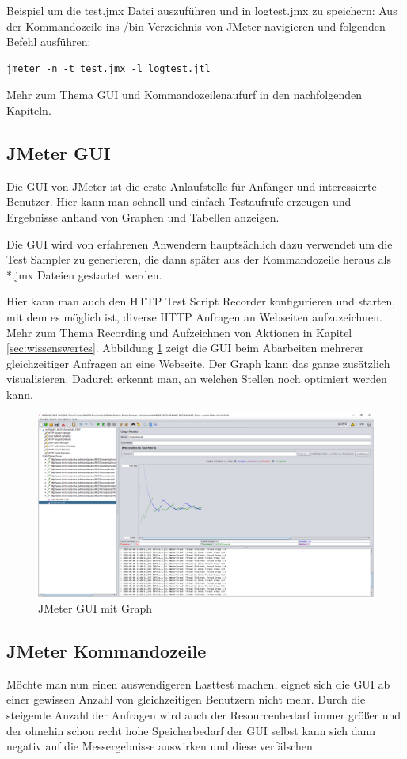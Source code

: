 \documentclass[a4paper,12pt]{article}
\begin{document}
Beispiel um die test.jmx Datei auszuführen und in logtest.jmx zu speichern: Aus der Kommandozeile ins /bin Verzeichnis von JMeter navigieren und folgenden Befehl ausführen: \
\begin{lstlisting}
jmeter -n -t test.jmx -l logtest.jtl
\end{lstlisting}
Mehr zum Thema GUI und Kommandozeilenaufurf in den nachfolgenden Kapiteln.

\subsection{JMeter GUI}
Die GUI von JMeter ist die erste Anlaufstelle für Anfänger und interessierte Benutzer. Hier kann man schnell und einfach Testaufrufe erzeugen und Ergebnisse anhand von Graphen und Tabellen anzeigen. 

Die GUI wird von erfahrenen Anwendern hauptsächlich dazu verwendet um die Test Sampler zu generieren, die dann später aus der Kommandozeile heraus als *.jmx Dateien gestartet werden.

Hier kann man auch den HTTP Test Script Recorder konfigurieren und starten, mit dem es möglich ist, diverse HTTP Anfragen an Webseiten aufzuzeichnen. Mehr zum Thema Recording und Aufzeichnen von Aktionen in Kapitel \ref{sec:wissenswertes}. Abbildung \ref{fig:gui_graph} zeigt die GUI beim Abarbeiten mehrerer gleichzeitiger Anfragen an eine Webseite. Der Graph kann das ganze zusätzlich visualisieren. Dadurch erkennt man, an welchen Stellen noch  optimiert werden kann.

\begin{figure}[htb]%
 \centering
    \includegraphics[width=1\textwidth]{bilder/jmeter_2.png}
  \caption{JMeter GUI mit Graph}
  \label{fig:gui_graph}
\end{figure}


\subsection{JMeter Kommandozeile}
\label{chap:jmeter_commandline}
Möchte man nun einen auswendigeren Lasttest machen, eignet sich die GUI ab einer gewissen Anzahl von gleichzeitigen Benutzern nicht mehr. Durch die steigende Anzahl der Anfragen wird auch der Resourcenbedarf immer größer und der ohnehin schon recht hohe Speicherbedarf der GUI selbst kann sich dann negativ auf die Messergebnisse auswirken und diese verfälschen.
\end{document}
